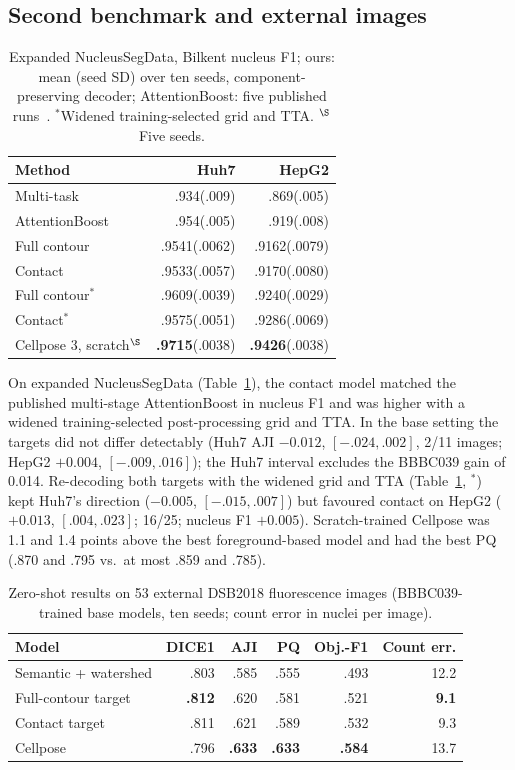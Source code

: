 \documentclass{article}
\begin{document}
\subsection{Second benchmark and external images}
\begin{table}[t]
\centering\footnotesize
\caption{Expanded NucleusSegData, Bilkent nucleus F1; ours: mean (seed SD) over ten seeds, component-preserving decoder; AttentionBoost: five published runs~\cite{gunesli2020attentionboost}. $^\ast$Widened training-selected grid and TTA. $^\S$Five seeds.}
\label{tab:nucleusseg}
\setlength{\tabcolsep}{3pt}
\begin{tabular}{@{}lrr@{}}\toprule
Method & Huh7 & HepG2\\\midrule
Multi-task~\cite{gunesli2020attentionboost} & .934(.009) & .869(.005)\\
AttentionBoost~\cite{gunesli2020attentionboost} & .954(.005) & .919(.008)\\
Full contour & .9541(.0062) & .9162(.0079)\\
Contact & .9533(.0057) & .9170(.0080)\\
Full contour$^\ast$ & .9609(.0039) & .9240(.0029)\\
Contact$^\ast$ & .9575(.0051) & .9286(.0069)\\
Cellpose 3, scratch$^\S$ & \textbf{.9715}(.0038) & \textbf{.9426}(.0038)\\\bottomrule
\end{tabular}
\end{table}
On expanded NucleusSegData (Table~\ref{tab:nucleusseg}), the contact model matched the published multi-stage AttentionBoost in nucleus F1 and was higher with a widened training-selected post-processing grid and TTA. In the base setting the targets did not differ detectably (Huh7 AJI $-0.012$, $[-.024,.002]$, 2/11 images; HepG2 $+0.004$, $[-.009,.016]$); the Huh7 interval excludes the BBBC039 gain of 0.014. Re-decoding both targets with the widened grid and TTA (Table~\ref{tab:nucleusseg}, $^\ast$) kept Huh7's direction ($-0.005$, $[-.015,.007]$) but favoured contact on HepG2 ($+0.013$, $[.004,.023]$; 16/25; nucleus F1 $+0.005$). Scratch-trained Cellpose was 1.1 and 1.4 points above the best foreground-based model and had the best PQ (.870 and .795 vs.\ at most .859 and .785). \begin{table}[t]
\centering\footnotesize
\caption{Zero-shot results on 53 external DSB2018 fluorescence images (BBBC039-trained base models, ten seeds; count error in nuclei per image).}
\label{tab:external}
\setlength{\tabcolsep}{3pt}
\begin{tabular}{@{}lrrrrr@{}}\toprule
Model & DICE1 & AJI & PQ & Obj.-F1 & Count err.\\\midrule
Semantic + watershed & .803 & .585 & .555 & .493 & 12.2\\
Full-contour target & \textbf{.812} & .620 & .581 & .521 & \textbf{9.1}\\
Contact target & .811 & .621 & .589 & .532 & 9.3\\
Cellpose & .796 & \textbf{.633} & \textbf{.633} & \textbf{.584} & 13.7\\\bottomrule
\end{tabular}
\end{table}
\end{document}

